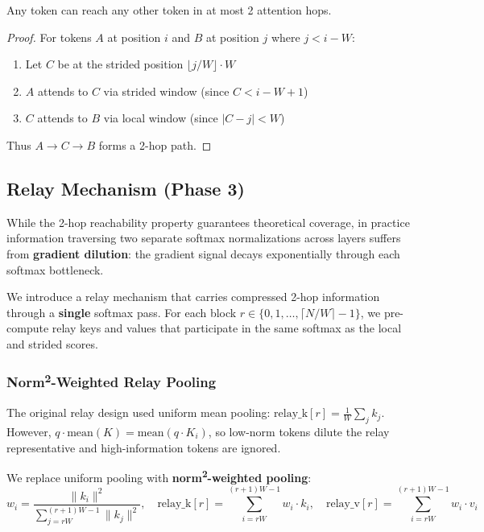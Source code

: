 \documentclass{article}
\begin{document}
    \begin{theorem}
    Any token can reach any other token in at most 2 attention hops.
    \end{theorem}

    \begin{proof}
    For tokens $A$ at position $i$ and $B$ at position $j$ where $j < i - W$:
    \begin{enumerate}
        \item Let $C$ be at the strided position $\lfloor j/W \rfloor \cdot W$
        \item $A$ attends to $C$ via strided window (since $C < i - W + 1$)
        \item $C$ attends to $B$ via local window (since $|C - j| < W$)
    \end{enumerate}
    Thus $A \rightarrow C \rightarrow B$ forms a 2-hop path.
    \end{proof}

    \subsection{Relay Mechanism (Phase 3)}

    While the 2-hop reachability property guarantees theoretical coverage, in practice information traversing two separate softmax normalizations across layers suffers from \textbf{gradient dilution}: the gradient signal decays exponentially through each softmax bottleneck.

    We introduce a relay mechanism that carries compressed 2-hop information through a \textbf{single} softmax pass. For each block $r \in \{0, 1, \ldots, \lceil N/W \rceil - 1\}$, we pre-compute relay keys and values that participate in the same softmax as the local and strided scores.

    \subsubsection{Norm\textsuperscript{2}-Weighted Relay Pooling}
    \label{sec:relay_improvements}

    The original relay design used uniform mean pooling: $\text{relay\_k}[r] = \frac{1}{W}\sum_j k_j$. However, $q \cdot \text{mean}(K) = \text{mean}(q \cdot K_i)$, so low-norm tokens dilute the relay representative and high-information tokens are ignored.

    We replace uniform pooling with \textbf{norm\textsuperscript{2}-weighted pooling}:
    \begin{equation}
    w_i = \frac{\|k_i\|^2}{\sum_{j=rW}^{(r+1)W-1} \|k_j\|^2}, \quad
    \text{relay\_k}[r] = \sum_{i=rW}^{(r+1)W-1} w_i \cdot k_i, \quad
    \text{relay\_v}[r] = \sum_{i=rW}^{(r+1)W-1} w_i \cdot v_i
    \end{equation}
\end{document}
